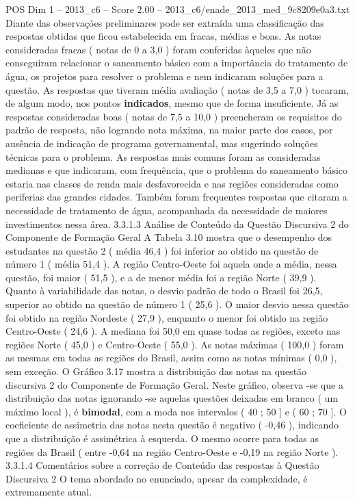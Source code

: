 \begin{textsample}{POS Dim 1 – 2013\_c6 – Score 2.00 – 2013\_c6/enade\_2013\_med\_9c8209e0a3.txt}
Diante das observações preliminares pode ser extraída uma classificação das respostas obtidas que ficou estabelecida em fracas, médias e boas.
As notas consideradas fracas ( notas de 0 a 3,0 ) foram conferidas àqueles que não conseguiram relacionar o saneamento básico com a importância do tratamento de água, os projetos para resolver o problema e nem indicaram soluções para a questão.
As respostas que tiveram média avaliação ( notas de 3,5 a 7,0 ) tocaram, de algum modo, nos pontos \textbf{indicados}, mesmo que de forma insuficiente.
Já as respostas consideradas boas ( notas de 7,5 a 10,0 ) preencheram os requisitos do padrão de resposta, não logrando nota máxima, na maior parte dos casos, por ausência de indicação de programa governamental, mas sugerindo soluções técnicas para o problema.
As respostas mais comuns foram as consideradas medianas e que indicaram, com frequência, que o problema do saneamento básico estaria nas classes de renda mais desfavorecida e nas regiões consideradas como periferias das grandes cidades.
Também foram frequentes respostas que citaram a necessidade de tratamento de água, acompanhada da necessidade de maiores investimentos nessa área. 3.3.1.3 Análise de Conteúdo da Questão Discursiva 2 do Componente de Formação Geral A Tabela 3.10 mostra que o desempenho dos estudantes na questão 2 ( média 46,4 ) foi inferior ao obtido na questão de número 1 ( média 51,4 ).
A região Centro-Oeste foi aquela onde a média, nessa questão, foi maior ( 51,5 ), e a de menor média foi a região Norte ( 39,9 ).
Quanto à variabilidade das notas, o desvio padrão de todo o Brasil foi 26,5, superior ao obtido na questão de número 1 ( 25,6 ).
O maior desvio nessa questão foi obtido na região Nordeste ( 27,9 ), enquanto o menor foi obtido na região Centro-Oeste ( 24,6 ).
A mediana foi 50,0 em quase todas as regiões, exceto nas regiões Norte ( 45,0 ) e Centro-Oeste ( 55,0 ).
As notas máximas ( 100,0 ) foram as mesmas em todas as regiões do Brasil, assim como as notas mínimas ( 0,0 ), sem exceção.
O Gráfico 3.17 mostra a distribuição das notas na questão discursiva 2 do Componente de Formação Geral.
Neste gráfico, observa -se que a distribuição das notas ignorando -se aquelas questões deixadas em branco ( um máximo local ), é \textbf{bimodal}, com a moda nos intervalos ( 40 ; 50 ] e ( 60 ; 70 ].
O coeficiente de assimetria das notas nesta questão é negativo ( -0,46 ), indicando que a distribuição é assimétrica à esquerda.
O mesmo ocorre para todas as regiões da Brasil ( entre -0,64 na região Centro-Oeste e -0,19 na região Norte ). 3.3.1.4 Comentários sobre a correção de Conteúdo das respostas à Questão Discursiva 2 O tema abordado no enunciado, apesar da complexidade, é extremamente atual.

\end{textsample}
